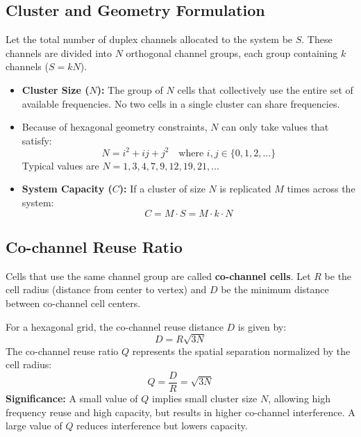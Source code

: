 \documentclass[12pt,a4paper]{article}
\begin{document}
\subsection{Cluster and Geometry Formulation}
Let the total number of duplex channels allocated to the system be $S$. These channels are divided into $N$ orthogonal channel groups, each group containing $k$ channels ($S = k N$).
\begin{itemize}[leftmargin=*, itemsep=2.5pt]
  \item \textbf{Cluster Size ($N$):} The group of $N$ cells that collectively use the entire set of available frequencies. No two cells in a single cluster can share frequencies.
  \item Because of hexagonal geometry constraints, $N$ can only take values that satisfy:
    \begin{equation}
      N = i^2 + ij + j^2 \quad \text{where } i, j \in \{0, 1, 2, \dots\}
    \end{equation}
    Typical values are $N = 1, 3, 4, 7, 9, 12, 19, 21, \dots$
  \item \textbf{System Capacity ($C$):} If a cluster of size $N$ is replicated $M$ times across the system:
    \begin{equation}
      C = M \cdot S = M \cdot k \cdot N
    \end{equation}
\end{itemize}

\subsection{Co-channel Reuse Ratio}
Cells that use the same channel group are called \textbf{co-channel cells}. Let $R$ be the cell radius (distance from center to vertex) and $D$ be the minimum distance between co-channel cell centers.
\begin{tcolorbox}[formulabox, title={\textbf{Co-channel Reuse Distance and Ratio}}]
For a hexagonal grid, the co-channel reuse distance $D$ is given by:
\begin{equation}
  D = R \sqrt{3N}
\end{equation}
The co-channel reuse ratio $Q$ represents the spatial separation normalized by the cell radius:
\begin{equation}
  Q = \frac{D}{R} = \sqrt{3N}
\end{equation}
\textbf{Significance:} A small value of $Q$ implies small cluster size $N$, allowing high frequency reuse and high capacity, but results in higher co-channel interference. A large value of $Q$ reduces interference but lowers capacity.
\end{tcolorbox}
\end{document}
